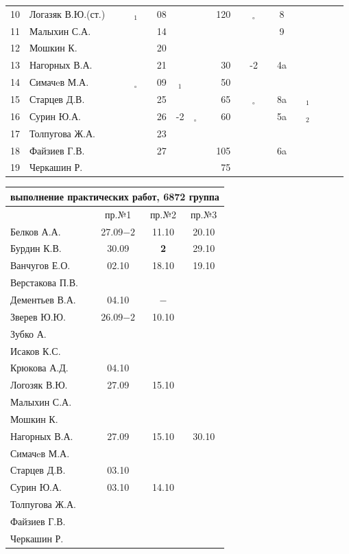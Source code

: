 \documentclass[a4paper,landscape,11pt]{article}
\newcommand*\OK{&\small \ding{51}$\!\!_\circ$} %
\newcommand*\Ok{&\small \ding{51}$\!\!_\circ$} %
\newcommand*\ok{&{\small\ding{51}}} %
\newcommand*\no{&{\small }} %
\newcommand*\da{&{\small\ding{48}$\!\!_1$}} %
\newcommand*\db{&{\small\ding{48}$\!\!_2$}} %
\begin{document}
\begin{tabular}{l|l|ccccccccrccccccccc}
10& Логазяк В.Ю.(ст.)\ok\ok\da\ok&08\no\ok\ok&120\ok\Ok\ok&  8\ok\ok\ok&\\
11& Малыхин С.А.     \ok\no\ok\ok&14\no\no\no \no\no\ok\ok&  9\no\no\no&\\
12& Мошкин К.        \ok\ok\ok\ok&20\ok\no\no \no\no\no\ok \no\no\no\no&\\
13& Нагорных В.А.    \ok\ok\ok\ok&21\ok\ok\ok& 30\ok&-2\ok& 4a\ok\ok\ok&\\
14& Симачeв М.А.     \ok\ok\OK\ok&09\da\no\no& 50\no\no\no \no\no\ok\ok&\\
15& Старцев Д.В.     \ok\ok\ok\ok&25\ok\ok\ok& 65\ok\Ok\ok& 8a\ok\da\ok&\\
16& Сурин Ю.А.       \ok\ok\ok\ok&26&-2\OK\ok& 60\ok\ok\ok& 5a\ok\db\ok&\\
17& Толпугова Ж.А.   \no\no\no\no&23\ok\no\no \no\no\no\no \no\no\ok\ok&\\
18& Файзиев Г.В.     \ok\ok\ok\ok&27\ok\ok\ok&105\ok\ok\ok& 6a\ok\no\ok&\\
19& Черкашин Р.      \ok\ok\ok\ok\no\no\no\no& 75\no\ok\ok \no\no\no\no&\\ 
\bottomrule
\end{tabular} 

\newpage
\begin{tabular}{l|ccc}
\multicolumn{4}{c}{выполнение практических работ, 6872 группа} \\
\toprule
& пр.№1 & пр.№2 & пр.№3 \\
\midrule
Белков А.А.    &27.09$-2$&11.10  &20.10\\   
Бурдин К.В.    &30.09    &{\bf 2}&29.10\\
Ванчугов Е.О.  &02.10    &18.10  &19.10\\
Верстакова П.В.&         &       &\\
Дементьев В.А. &04.10    &$-$    &\\
Зверев Ю.Ю.    &26.09$-2$&10.10  &\\
Зубко А.       &         &       &\\
Исаков К.С.    &         &       &\\
Крюкова А.Д.   &04.10    &       &\\
Логозяк В.Ю.   &27.09    &15.10  &\\
Малыхин С.А.   &         &       &\\
Мошкин К.      &         &       &\\
Нагорных В.А.  &27.09    &15.10  &30.10\\
Симачeв М.А.   &         &       &\\
Старцев Д.В.   &03.10    &       &\\
Сурин Ю.А.     &03.10    &14.10  &\\
Толпугова Ж.А. &         &       &\\
Файзиев Г.В.   &         &       &\\
Черкашин Р.    &         &       &\\
\bottomrule
\end{tabular}
\end{document}
